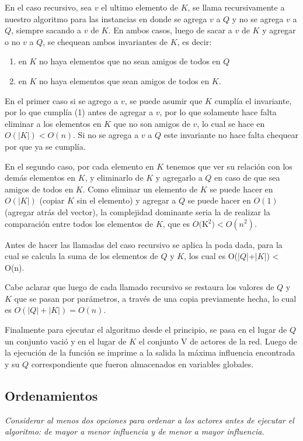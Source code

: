 \documentclass[10pt, a4paper]{article}
\begin{document}
En el caso recursivo, sea $v$ el ultimo elemento de $K$, se llama recursivamente a nuestro algoritmo para las instancias en donde se agrega $v$ a $Q$ y no se agrega $v$ a $Q$, siempre sacando a $v$ de $K$. En ambos casos, luego de sacar a $v$ de $K$ y agregar o no $v$ a $Q$, se chequean ambos invariantes de $K$, es decir: \begin{enumerate}
\item en $K$ no haya elementos que no sean amigos de todos en $Q$ 
\item en $K$ no haya elementos que sean amigos de todos en $K$. 
\end{enumerate}

En el primer caso si se agrego a $v$, se puede asumir que $K$ cumplía el invariante, por lo que cumplía (1) antes de agregar a $v$, por lo que solamente hace falta eliminar a los elementos en $K$ que no son amigos de $v$, lo cual se hace en $O(|K|) < O(n)$. Si no se agrega a $v$ a $Q$ este invariante no hace falta chequear por que ya se cumplía.

En el segundo caso, por cada elemento en $K$ tenemos que ver su relación con los demás elementos en $K$, y eliminarlo de $K$ y agregarlo a $Q$ en caso de que sea amigos de todos en $K$. Como eliminar un elemento de $K$ se puede hacer en $O(|K|)$ (copiar $K$ sin el elemento) y agregar a $Q$ se puede hacer en $O(1)$ (agregar atrás del vector), la complejidad dominante seria la de realizar la comparación entre todos los elementos de $K$, que es $O($K$^2) < O(n^2)$.

Antes de hacer las llamadas del caso recursivo se aplica la poda dada, para la cual se calcula la suma de los elementos de $Q$ y $K$, los cual es O(|$Q$|+|$K$|) < O(n).

Cabe aclarar que luego de cada llamado recursivo se restaura los valores de $Q$ y $K$ que se pasan por parámetros, a través de una copia previamente hecha, lo cual es $O(|Q|+|K|) = O(n)$.

Finalmente para ejecutar el algoritmo desde el principio, se pasa en el lugar de $Q$ un conjunto vació y en el lugar de $K$ el conjunto V de actores de la red. Luego de la ejecución de la función se imprime a la salida la máxima influencia encontrada y su $Q$ correspondiente que fueron almacenados en variables globales.

\subsection{Ordenamientos}
\emph{Considerar al menos dos opciones para ordenar a los actores antes de ejecutar el algoritmo: de
mayor a menor influencia y de menor a mayor influencia.} \\
\end{document}
